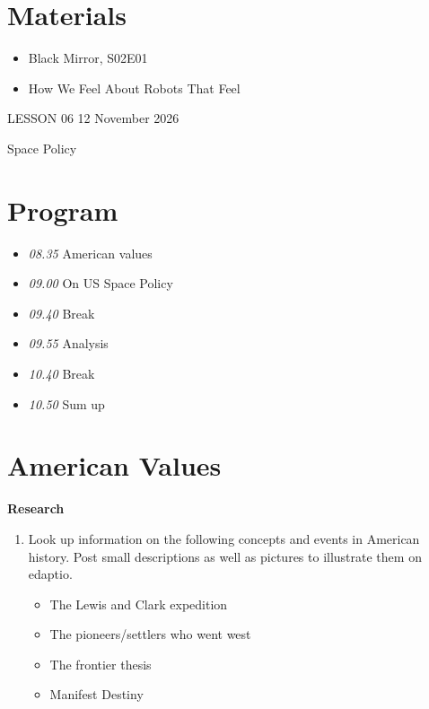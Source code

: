 \documentclass[11pt,a4paper,oneside]{book}
\newcommand{\tasktitle}[1]{{\color{blue}\bfseries #1}\par\smallskip}
\begin{document}
\section*{Materials}

\begin{itemize}
\item Black Mirror, S02E01
\item How We Feel About Robots That Feel
\end{itemize}

\clearpage{}
{\color{blue}\small LESSON 06 \hfill 12 November 2026\par}
\vspace{4mm}
{\displayfont\color{navy}\fontsize{30}{34}\selectfont Space Policy\par}\vspace{4mm}

\section*{Program}

\begin{itemize}
\item \emph{08.35} American values
\item \emph{09.00} On US Space Policy
\item \emph{09.40} Break
\item \emph{09.55} Analysis
\item \emph{10.40} Break
\item \emph{10.50} Sum up
\end{itemize}

\section*{American Values}
\begin{taskbox}
\tasktitle{Research}
\begin{enumerate}
\item Look up information on the following concepts and events in American history. Post small descriptions as well as pictures to illustrate them on edaptio.

\begin{itemize}
\item The Lewis and Clark expedition
\item The pioneers/settlers who went west
\item The frontier thesis
\item Manifest Destiny
\end{itemize}

\end{enumerate}
\end{taskbox}
\end{document}
